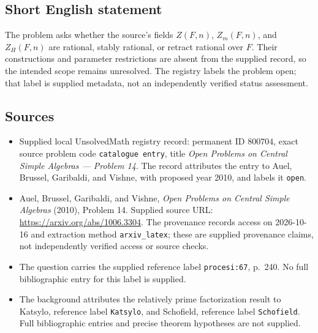 \documentclass[11pt]{article}
\begin{document}
\subsection{Short English statement}
The problem asks whether the source's fields \(Z(F,n)\), \(Z_m(F,n)\), and \(Z_H(F,n)\) are rational, stably rational, or retract rational over \(F\). Their constructions and parameter restrictions are absent from the supplied record, so the intended scope remains unresolved. The registry labels the problem open; that label is supplied metadata, not an independently verified status assessment.
\subsection{Sources}
\begin{itemize}
\item Supplied local UnsolvedMath registry record: permanent ID \(800704\), exact source problem code \texttt{catalogue entry}, title \emph{Open Problems on Central Simple Algebras --- Problem 14}. The record attributes the entry to Auel, Brussel, Garibaldi, and Vishne, with proposed year 2010, and labels it \texttt{open}.
\item Auel, Brussel, Garibaldi, and Vishne, \emph{Open Problems on Central Simple Algebras} (2010), Problem 14. Supplied source URL: \url{https://arxiv.org/abs/1006.3304}. The provenance records access on 2026-10-16 and extraction method \texttt{arxiv\_latex}; these are supplied provenance claims, not independently verified access or source checks.
\item The question carries the supplied reference label \texttt{procesi:67}, p.~240. No full bibliographic entry for this label is supplied.
\item The background attributes the relatively prime factorization result to Katsylo, reference label \texttt{Katsylo}, and Schofield, reference label \texttt{Schofield}. Full bibliographic entries and precise theorem hypotheses are not supplied.
\end{itemize}
\end{document}
